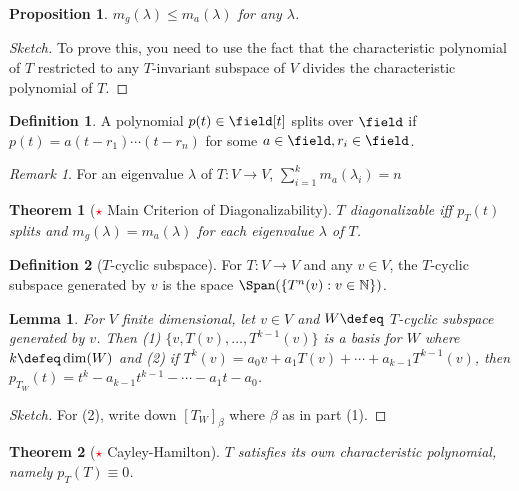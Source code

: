 \documentclass[12pt, oneside]{article}
\theoremstyle{definition}
\newtheorem{defn}{Definition}
\theoremstyle{plain}
\newtheorem{thm}{Theorem}
\newtheorem{prop}{Proposition}
\newtheorem{lemma}{Lemma}
\theoremstyle{remark}
\newtheorem{remark}{Remark}
\begin{document}
\begin{prop}
  $m_g(\lambda) \leq m_a(\lambda)$ for any $\lambda$.
\end{prop}

\begin{proof}[Sketch]
  To prove this, you need to use the fact that the characteristic polynomial of $T$ restricted to any $T$-invariant subspace of $V$ divides the characteristic polynomial of $T$.
\end{proof}
\begin{defn}
  A polynomial $p(t) \in \field[t]$ splits over $\field$ if $p(t) = a (t-r_1)\cdots(t-r_n)$ for some $a \in \field, r_i \in \field$.
\end{defn}
\begin{remark}
  For an eigenvalue $\lambda$ of $T : V \to V$, $\sum_{i=1}^k m_a(\lambda_i) = n$
\end{remark}
\begin{thm}[\textcolor{red}{$\star$} Main Criterion of Diagonalizability]
  $T$ diagonalizable iff $p_T(t)$ splits and $m_g(\lambda) = m_a(\lambda)$ for each eigenvalue $\lambda$ of $T$.
\end{thm}

\begin{defn}[$T$-cyclic subspace]
  For $T : V \to V$ and any $v \in V$, the $T$-cyclic subspace generated by $v$ is the space $\Span(\{T^n(v) : v \in \mathbb{N}\})$.
\end{defn}

\begin{lemma}
  For $V$ finite dimensional, let $v \in V$ and $W \defeq$ $T$-cyclic subspace generated by $v$. Then (1) $\{v, T(v), \dots, T^{k-1}(v)\}$ is a basis for $W$ where $k \defeq \dim(W)$ and (2) if $T^{k}(v) = a_0 v + a_1 T(v) + \cdots + a_{k-1}T^{k-1}(v)$, then $p_{T_W}(t) = t^k - a_{k-1}t^{k-1} - \cdots - a_1 t - a_0$.
\end{lemma}

\begin{proof}[Sketch]
  For (2), write down $[T_W]_\beta$ where $\beta$ as in part (1).
\end{proof}

\begin{thm}[\textcolor{red}{$\star$} Cayley-Hamilton]
  $T$ satisfies its own characteristic polynomial, namely $p_T(T) \equiv 0$.
\end{thm}
\end{document}
